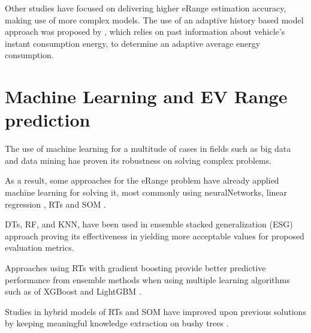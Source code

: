 Other studies have focused on delivering 
higher \gls{eRange} estimation accuracy,
making use of more complex models. 
The use of an adaptive history based model 
approach was proposed by \cite{classicEVX},
which relies on past information about
vehicle's instant consumption energy, to determine an
adaptive average energy consumption.

\section{Machine Learning and EV Range prediction}
\label{sec:stateOfArtML}

The use of machine learning for a multitude
of cases \citep{machineLearningCaseStudy} in fields such as 
big data \citep{machineLearningBigData, machineLearningBigData2}
and data mining \citep{businessDataMining} has 
proven its robustness on solving complex problems.

As a result, some approaches for the \gls{eRange}
problem have already applied machine learning 
for solving it, most commonly using \gls{neuralNetworks}, 
linear regression \citep{eRangeMachineLearningNeuralnetworkMLR},
\glspl{RT} and \gls{SOM} \citep{eRangeMachineLearningGHSOM}.

\glspl{DT}, \gls{RF}, and \gls{KNN}, have been 
used in ensemble stacked generalization (ESG) approach 
\citep{eRangeMachineLearningEnsemble} proving its 
effectiveness in yielding more acceptable values
for proposed evaluation metrics.

Approaches using \glspl{RT} with gradient boosting 
provide better predictive performance from
ensemble methods when using multiple learning algorithms
such as of \gls{XGBoost} and \gls{LightGBM}
\citep{machineLearningERangeGradientBoostRts}.

Studies in hybrid models of \glspl{RT} and \gls{SOM} 
have improved upon previous solutions by
keeping meaningful knowledge extraction on bushy trees
\citep{machineLearningERangeSOMandRts}.


